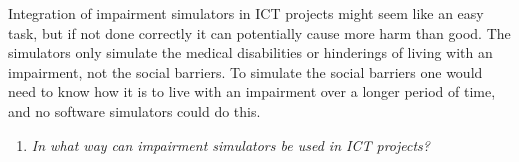 




Integration of impairment simulators in ICT projects might seem like an easy task, but if not done correctly it can potentially cause more harm than good. The simulators only simulate the medical disabilities or hinderings of living with an impairment, not the social barriers. To simulate the social barriers one would need to know how it is to live with an impairment over a longer period of time, and no software simulators could do this. 



\begin{enumerate}\addtocounter{enumi}{1}
\item \textit{In what way can impairment simulators be used in ICT projects?}
\end{enumerate} 





